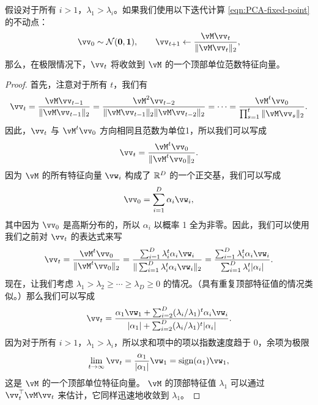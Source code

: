 \documentclass[../../book-main_zh.tex]{subfiles}
\begin{document}
\begin{theorem}[幂迭代法]
假设对于所有 \(i > 1\)，\(\lambda_{1} > \lambda_{i}\)。如果我们使用以下迭代计算 \eqref{eqn:PCA-fixed-point} 的不动点：
\begin{equation}\label{eq:power_iteration}
    \vv_{0} \sim \dNorm(\vzero, \vone), \qquad \vv_{t + 1} \gets \frac{\vM\vv_{t}}{\norm{\vM\vv_{t}}_{2}},
\end{equation}
那么，在极限情况下，\(\vv_{t}\) 将收敛到 \(\vM\) 的一个顶部单位范数特征向量。
\end{theorem}

\begin{proof} 首先，注意对于所有 \(t\)，我们有
\begin{equation}
    \vv_{t} = \frac{\vM\vv_{t - 1}}{\norm{\vM\vv_{t - 1}}_{2}} = \frac{\vM^{2}\vv_{t - 2}}{\norm{\vM\vv_{t - 1}}_{2}\norm{\vM\vv_{t - 2}}_{2}} = \cdots = \frac{\vM^{t}\vv_{0}}{\prod_{s = 1}^{t}\norm{\vM\vv_{s}}_{2}}.
\end{equation}
因此，\(\vv_{t}\) 与 \(\vM^{t}\vv_{0}\) 方向相同且范数为单位1，所以我们可以写成
\begin{equation}
    \vv_{t} = \frac{\vM^{t}\vv_{0}}{\norm{\vM^{t}\vv_{0}}_{2}}.
\end{equation}
因为 $\vM$ 的所有特征向量 \(\vw_{i}\) 构成了 \(\mathbb{R}^{D}\) 的一个正交基，我们可以写成
\begin{equation}
    \vv_{0} = \sum_{i = 1}^{D}\alpha_{i}\vw_{i},
\end{equation}
其中因为 \(\vv_{0}\) 是高斯分布的，所以 \(\alpha_{i}\) 以概率 1 全为非零。因此，我们可以使用我们之前对 \(\vv_{t}\) 的表达式来写
\begin{equation}
    \vv_{t} = \frac{\vM^{t}\vv_{0}}{\norm{\vM^{t}\vv_{0}}_{2}} = \frac{\sum_{i = 1}^{D}\lambda_{i}^{t}\alpha_{i}\vw_{i}}{\norm{\sum_{i = 1}^{D}\lambda_{i}^{t}\alpha_{i}\vw_{i}}_{2}} = \frac{\sum_{i = 1}^{D}\lambda_{i}^{t}\alpha_{i}\vw_{i}}{\sum_{i = 1}^{D}\lambda_{i}^{t}\abs{\alpha_{i}}}. 
\end{equation}
现在，让我们考虑 \(\lambda_{1} > \lambda_{2} \geq \cdots \geq \lambda_{D} \geq 0\) 的情况。（具有重复顶部特征值的情况类似。）那么我们可以写成
\begin{equation}
    \vv_{t} = \frac{\alpha_{1}\vw_{1} + \sum_{i = 2}^{D}(\lambda_{i}/\lambda_{1})^{t}\alpha_{i}\vw_{i}}{\abs{\alpha_{1}} + \sum_{i = 2}^{D}(\lambda_{i}/\lambda_{1})^{t}\abs{\alpha_{i}}}.
\end{equation}
因为对于所有 \(i > 1\)，\(\lambda_{1} > \lambda_{i}\)，所以求和项中的项以指数速度趋于 0，余项为极限
\begin{equation}
    \lim_{t \to \infty}\vv_{t} = \frac{\alpha_{1}}{\abs{\alpha_{1}}}\vw_{1} = \sign(\alpha_{1})\vw_{1},
\end{equation}
这是 \(\vM\) 的一个顶部单位特征向量。 \(\vM\) 的顶部特征值 \(\lambda_{1}\) 可以通过 \(\vv_{t}^{\top}\vM\vv_{t}\) 来估计，它同样迅速地收敛到 \(\lambda_{1}\)。
\end{proof}
\end{document}
